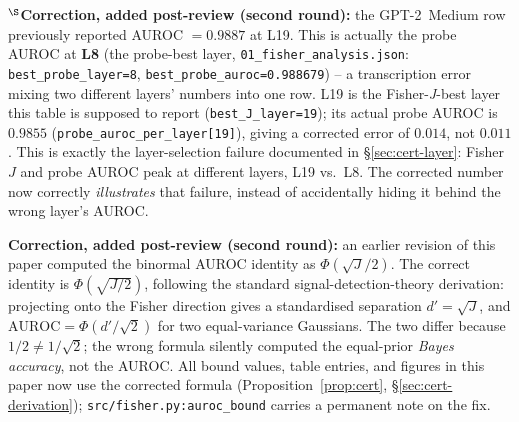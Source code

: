 \documentclass[onecolumn]{jmlr}
\begin{document}
$^\S$\textbf{Correction, added post-review (second round):} the
GPT-2~Medium row previously reported AUROC $= 0.9887$ at L19. This is
actually the probe AUROC at \textbf{L8} (the probe-best layer,
\texttt{01\_\allowbreak fisher\_\allowbreak analysis.json}: \texttt{best\_\allowbreak probe\_\allowbreak layer=8},
\texttt{best\_\allowbreak probe\_\allowbreak auroc=0.988679}) -- a transcription error mixing
two different layers' numbers into one row. L19 is the
Fisher-\emph{J}-best layer this table is supposed to report
(\texttt{best\_J\_layer=19}); its actual probe AUROC is $0.9855$
(\texttt{probe\_\allowbreak auroc\_\allowbreak per\_\allowbreak layer[19]}), giving a corrected error of
$0.014$, not $0.011$. This is exactly the layer-selection failure
documented in \S\ref{sec:cert-layer}: Fisher~$J$ and probe AUROC peak at
different layers, L19 vs.\ L8. The corrected number now correctly
\emph{illustrates} that failure, instead of accidentally hiding it
behind the wrong layer's AUROC.

\textbf{Correction, added post-review (second round):} an earlier
revision of this paper computed the binormal AUROC identity as
$\Phi(\sqrt{J}/2)$. The correct identity is $\Phi(\sqrt{J/2})$,
following the standard signal-detection-theory derivation: projecting
onto the Fisher direction gives a standardised separation $d' =
\sqrt{J}$, and $\text{AUROC} = \Phi(d'/\sqrt{2})$ for two equal-variance
Gaussians. The two differ because $1/2 \neq 1/\sqrt{2}$; the wrong
formula silently computed the equal-prior \emph{Bayes accuracy}, not the
AUROC. All bound values, table entries, and figures in this paper now
use the corrected formula (Proposition~\ref{prop:cert},
\S\ref{sec:cert-derivation}); \texttt{src/\allowbreak fisher.py:auroc\_\allowbreak bound} carries
a permanent note on the fix.
\end{document}
